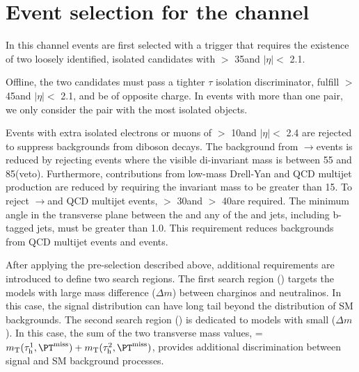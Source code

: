 \section{\texorpdfstring{Event selection for the \tauTau channel}{Event selection for the tau-tau channel}}
\label{sect:tauTauCuts}
In this channel events are first selected with a trigger \cite{Khachatryan:2015hwa,Chatrchyan:2012xi,Chatrchyan:2011nv}
that requires the existence of
two loosely identified, isolated \Tau candidates with \PT $>$ 35\GeV and $|\eta|<$ 2.1.   

Offline, %
the two \Tau candidates must pass a tighter $\tau$ isolation discriminator,
fulfill \PT $>$ 45\GeV and $|\eta|<$ 2.1, and be of opposite charge.
In events with more than one \tauTau pair, we only consider the pair with the most isolated \Tau objects. 

Events with extra isolated electrons or muons of \PT $>$ 10\GeV and $|\eta| <$ 2.4 
are rejected to suppress %
backgrounds from diboson decays.
The background from \Z$\rightarrow$\tauTau events is reduced by rejecting events where the visible
di-\Tau invariant mass is between 55 and 85\GeV (\Z veto).  
Furthermore, contributions from low-mass Drell-Yan and QCD multijet production are 
reduced by requiring the invariant mass to be greater than 15\GeV.
To reject \Z$\rightarrow$\tauTau and QCD multijet events, %
\MPT $>$ 30\GeV and \mttwo $>$ 40\GeV are required.
The minimum angle \deltaphi in the transverse plane between the \ptvecmiss and any of the \Tau and jets, 
including b-tagged jets, must be greater than 1.0. 
This requirement reduces backgrounds from QCD multijet events and \wjets events.

After applying the pre-selection described above,
additional requirements are introduced to define two search regions.
The first search region (\binone) targets the models with large mass difference ($\Delta m$) 
between charginos and neutralinos.
In this case, the \mttwo signal distribution can have long tail beyond the 
distribution of SM backgrounds.
The second search region (\bintwo) is dedicated to models with small ($\Delta m$).
In this case, the sum of the two transverse mass values, \SumMT = $\mt(\Tau^1,\MPT) + \mt(\Tau^2,\MPT)$, 
provides additional discrimination between signal and SM background processes.

